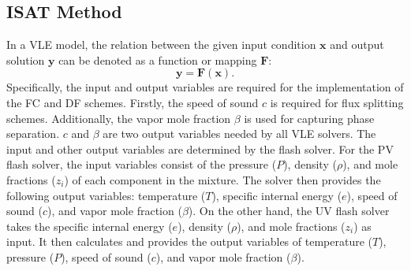 \subsection{ISAT Method}
In a VLE model, the relation between the given input condition $\boldsymbol{x}$ and output solution $\boldsymbol{y}$ can be denoted as a function or mapping $\boldsymbol{F}$:
$$\boldsymbol{y=F\left(x\right)}.$$
Specifically, the input and output variables are required for the implementation of the FC and DF schemes. Firstly, the speed of sound $c$ is required for flux splitting schemes. %
Additionally, the vapor mole fraction $\beta$ is used for capturing phase separation. $c$ and $\beta$ are two output variables needed by all VLE solvers. The input and other output variables are determined by the flash solver. For the PV flash solver, the input variables consist of the pressure ($P$), density ($\rho$), and mole fractions ($z_i$) of each component in the mixture. The solver then provides the following output variables: temperature ($T$), specific internal energy ($e$), speed of sound ($c$), and vapor mole fraction ($\beta$).
On the other hand, the UV flash solver takes the specific internal energy ($e$), density ($\rho$), and mole fractions ($z_i$) as input. It then calculates and provides the output variables of temperature ($T$), pressure ($P$), speed of sound ($c$), and vapor mole fraction ($\beta$).


